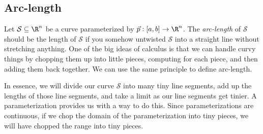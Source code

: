 \subsection{Arc-length}
Let $\mathcal S\subseteq \R^n$ be a curve parameterized by $\vec p:[a,b]\to\R^n$.  
The \emph{arc-length} of $\mathcal S$
should be the length of $\mathcal S$ if you somehow untwisted $\mathcal S$ into a straight
line without stretching anything.  One of the big ideas of calculus is that 
we can handle curvy things by chopping them up into little pieces, computing
for each piece, and then adding them back together.  We can use the same principle 
to define arc-length.

In essence, we will divide our curve $\mathcal S$ into many tiny line segments,
add up the lengths of those line segments, and take a limit as our line segments
get tinier.  A parameterization provides us with a way to do this.  Since parameterizations
are continuous, if we chop the domain of the parameterization into tiny pieces,
we will have chopped the range into tiny pieces.


%

